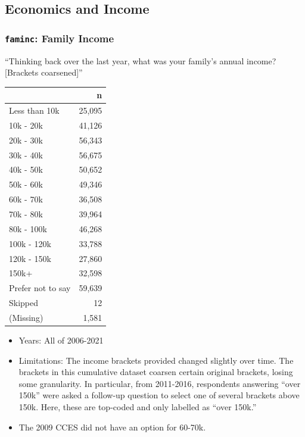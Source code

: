 \documentclass[10pt,article,oneside]{memoir}
\theoremstyle{definition}
\begin{document}
\hypertarget{economics-and-income}{%
\subsection{Economics and Income}\label{economics-and-income}}

\hypertarget{faminc-family-income}{%
\subsubsection{\texorpdfstring{\texttt{faminc}: Family
Income}{faminc: Family Income}}\label{faminc-family-income}}

``Thinking back over the last year, what was your family's annual
income? {[}Brackets coarsened{]}''

\begin{table}[H]
\centering
\begin{tabular}[t]{lr}
\toprule
 & n\\
\midrule
Less than 10k & 25,095\\
10k - 20k & 41,126\\
20k - 30k & 56,343\\
30k - 40k & 56,675\\
40k - 50k & 50,652\\
50k - 60k & 49,346\\
60k - 70k & 36,508\\
70k - 80k & 39,964\\
80k - 100k & 46,268\\
100k - 120k & 33,788\\
120k - 150k & 27,860\\
150k+ & 32,598\\
Prefer not to say & 59,639\\
Skipped & 12\\
(Missing) & 1,581\\
\bottomrule
\end{tabular}
\end{table}

\begin{itemize}
\tightlist
\item
  Years: All of 2006-2021
\item
  Limitations: The income brackets provided changed slightly over time.
  The brackets in this cumulative dataset coarsen certain original
  brackets, losing some granularity. In particular, from 2011-2016,
  respondents answering ``over 150k'' were asked a follow-up question to
  select one of several brackets above 150k. Here, these are top-coded
  and only labelled as ``over 150k.''
\item
  The 2009 CCES did not have an option for 60-70k.
\end{itemize}
\end{document}
